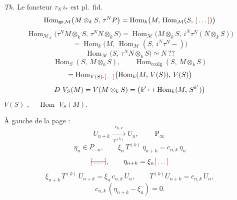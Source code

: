 \documentclass[11pt,a4paper]{article}
\begin{document}
\emph{Th.} Le foncteur $\tau_N\,i_*$ est pl.\ fid.
\[
\operatorname{Hom}_{\text{\struck{gr}}\,\mathcal{M}}\bigl(M\otimes_k S,\,\tau^{N}P\bigr) = \operatorname{Hom}_k\bigl(M,\,\operatorname{Hom}_{\mathcal{M}}(S,\,\ill{})\bigr)
\]
\[
\operatorname{Hom}_{\mathcal{M}_N}\bigl(\tau^{N}M\otimes_k S,\,\tau^{N}N\otimes_k S\bigr) = \operatorname{Hom}_{\mathcal{M}}\bigl(M\otimes_k S,\,i^{N}\tau^{N}(N\otimes_k S)\bigr)
\]
\[
= \operatorname{Hom}_k\bigl(M,\,\operatorname{Hom}_{\mathcal{M}}(S,\,i^{N}\tau^{N}-)\bigr)
\]
\[
\operatorname{Hom}_{\mathcal{M}}\bigl(S,\,\tau^{N}N\otimes_k S\bigr) \simeq N\ ??
\]
\[
\operatorname{Hom}_S(S,\,M\otimes_k S), \qquad \operatorname{Hom}_{\mathrm{coalg}}(S,\,M\otimes_k S)
\]
\[
= \operatorname{Hom}_{V(S)\text{-}\ill{}}\bigl(\operatorname{Hom}_k(M,\,V(S)),\,V(S)\bigr)
\]
\[
\text{\struck{$D$}}\ V_S(M) = V(M\otimes_k S) = \bigl(k' \mapsto \operatorname{Hom}_k(M,\,S^{k'})\bigr)
\]
$V(S)$ , \ \ $\operatorname{Hom}$ \ill{} $V_S(M)$.

À gauche de la page :
\[
U_{n+k} \xrightarrow[\;T^{(k)}\;]{\;c_{n,k}\;} U_n, \qquad \operatorname{P}_\infty
\]
\[
\eta_n \in P_{-n}, \qquad \xi_n\,T^{(k)}\,\eta_{n+k} = c_{n,k}\,\eta_n
\]
\[
\text{\struck{\ill{}}}, \qquad \eta_{n+k} = \xi_n \ill{}
\]
\[
\xi_{n+k}\,T^{(k)}\,U_{n+k} = \xi_n\,c_{n,k}\,U_n, \qquad T^{(k)}U_{n+k} = c_{n,k}\,U_n,
\]
\[
c_{n,k}\,(\eta_{n+k} - \xi_n) = 0.
\]
\end{document}
